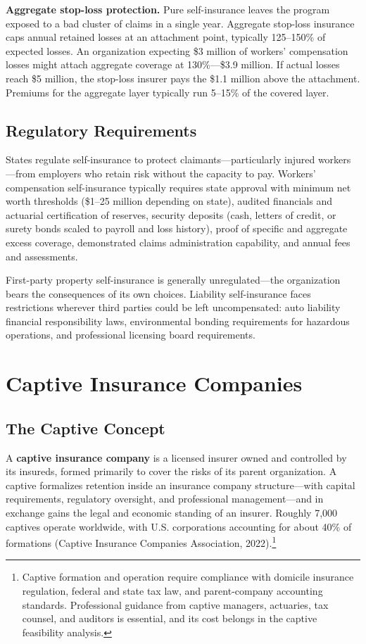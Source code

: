 \documentclass[11pt,openany]{book}
\begin{document}
\textbf{Aggregate stop-loss protection.} Pure self-insurance leaves the
program exposed to a bad cluster of claims in a single year. Aggregate
stop-loss insurance caps annual retained losses at an attachment point,
typically 125--150\% of expected losses. An organization expecting \$3
million of workers' compensation losses might attach aggregate coverage at
130\%---\$3.9 million. If actual losses reach \$5 million, the stop-loss
insurer pays the \$1.1 million above the attachment. Premiums for the
aggregate layer typically run 5--15\% of the covered layer.

\subsection{Regulatory Requirements}

States regulate self-insurance to protect claimants---particularly injured
workers---from employers who retain risk without the capacity to pay.
Workers' compensation self-insurance typically requires state approval with
minimum net worth thresholds (\$1--25 million depending on state), audited
financials and actuarial certification of reserves, security deposits (cash,
letters of credit, or surety bonds scaled to payroll and loss history), proof
of specific and aggregate excess coverage, demonstrated claims administration
capability, and annual fees and assessments.

First-party property self-insurance is generally unregulated---the
organization bears the consequences of its own choices. Liability
self-insurance faces restrictions wherever third parties could be left
uncompensated: auto liability financial responsibility laws, environmental
bonding requirements for hazardous operations, and professional licensing
board requirements.

\section{Captive Insurance Companies}
\label{sec:captives}

\subsection{The Captive Concept}

A \textbf{captive insurance company} is a licensed insurer owned and
controlled by its insureds, formed primarily to cover the risks of its parent
organization. A captive formalizes retention inside an insurance company
structure---with capital requirements, regulatory oversight, and professional
management---and in exchange gains the legal and economic standing of an
insurer. Roughly 7,000 captives operate worldwide, with U.S. corporations
accounting for about 40\% of formations (Captive Insurance Companies
Association, 2022).\footnote{Captive formation and operation require
compliance with domicile insurance regulation, federal and state tax law, and
parent-company accounting standards. Professional guidance from captive
managers, actuaries, tax counsel, and auditors is essential, and its cost
belongs in the captive feasibility analysis.}
\end{document}
